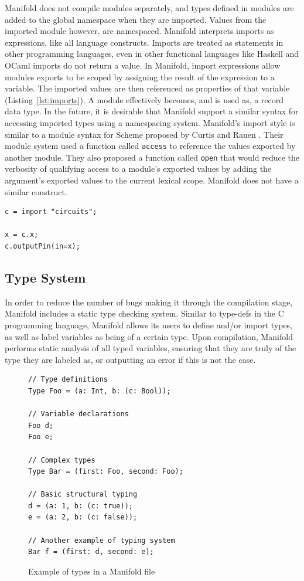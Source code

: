 Manifold does not compile modules separately, and types defined in modules are
added to the global namespace when they are imported. Values from the imported
module however, are namespaced. Manifold interprets imports as expressions,
like all language constructs. Imports are treated as statements in other
programming languages, even in other functional languages like Haskell and
OCaml imports do not return a value.  In Manifold, import expressions allow modules
exports to be scoped by assigning the result of the expression
to a variable. The imported values are then referenced as properties of that
variable (Listing~\ref{lst:imports}). A module effectively becomes, and is used as,
a
record data type. In the future, it is desirable that Manifold support a
similar syntax for accessing imported types using a namespacing system.
Manifold's import style is similar to a module syntax for Scheme proposed by
Curtis and Rauen \cite{Curtis:1990:MSS:91556.91573}. Their module system used
a function called \texttt{access} to reference the values exported by another
module. They also proposed a function called \texttt{open} that would reduce
the verbosity of qualifying access to a module's exported values by adding the
argument's exported values to the current lexical scope. Manifold does not
have a similar construct.

\begin{lstlisting}[label=lst:imports, caption=A module imported into a Manifold file]
c = import "circuits";

x = c.x;
c.outputPin(in=x);
\end{lstlisting}

\subsection{Type System}

In order to reduce the number of bugs making it through the compilation stage, Manifold includes a static type checking system. Similar to type-defs in the C programming language, Manifold allows its users to define and/or import types, as well as label variables as being of a certain type. Upon compilation, Manifold performs static analysis of all typed variables, ensuring that they are truly of the type they are labeled as, or outputting an error if this is not the case.



\begin{figure}[!ht]
\label{fig:exports}
\caption{Example of types in a Manifold file}
\begin{lstlisting}
// Type definitions
Type Foo = (a: Int, b: (c: Bool));

// Variable declarations
Foo d;
Foo e;

// Complex types
Type Bar = (first: Foo, second: Foo);

// Basic structural typing
d = (a: 1, b: (c: true));
e = (a: 2, b: (c: false));

// Another example of typing system
Bar f = (first: d, second: e);
\end{lstlisting}
\end{figure}

